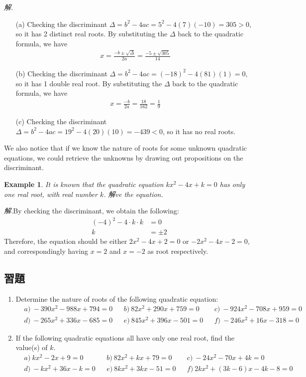 \documentclass[12pt]{article}
\newtheorem{example}{Example}
\begin{document}
    \textit{ 解.}\begin{enumerate}
        \item[(a)] Checking the discriminant $\Delta=b^2-4ac=5^2-4(7)(-10)=305>0$, so it has 2 distinct real roots. By substituting the $\Delta$ back to the quadratic formula, we have \begin{align*}
            x=\frac{-b\pm\sqrt{\Delta}}{2a}=\frac{-5\pm\sqrt{305}}{14}
        \end{align*}
        \item[(b)] Checking the discriminant $\Delta=b^2-4ac=(-18)^2-4(81)(1)=0$, so it has 1 double real root. By substituting the $\Delta$ back to the quadratic formula, we have \begin{align*}
            x=\frac{-b}{2a}=\frac{18}{162}=\frac{1}{9}
        \end{align*}
        \item[(c)] Checking the discriminant $\Delta=b^2-4ac=19^2-4(20)(10)=-439<0$, so it has no real roots. 
    \end{enumerate}

    We also notice that if we know the nature of roots for some unknown quadratic equations, we could retrieve the unknowns by drawing out propositions on the discriminant.

    \begin{example}
        It is known that the quadratic equation $kx^2-4x+k=0$ has only one real root, with real number $k$. 解ve the equation.
    \end{example}

    \textit{ 解.}By checking the discriminant, we obtain the following:\begin{align*}
        (-4)^2-4\cdot k\cdot k&=0\\
        k&=\pm 2
    \end{align*}
    \indent \indent Therefore, the equation should be either $2x^2-4x+2=0$ or $-2x^2-4x-2=0$, and correspondingly having $x=2$ and $x=-2$ as root respectively.

    \subsection*{習題}
    \begin{enumerate}
        \item Determine the nature of roots of the following quadratic equation:\begin{align*}
            &a)\ -390x^2-988x+794=0&&b)\ 82x^2+290x+759=0&&c)\ -924x^2-708x+959=0\\
            &d)\ -265x^2+336x-685=0&&e)\ 845x^2+396x-501=0&&f)\ -246x^2+16x-318=0
        \end{align*}
        \item If the following quadratic equations all have only one real root, find the value(s) of $k$.\begin{align*}
            &a)\ kx^2-2x+9=0&&b)\ 82x^2+kx+79=0&&c)\ -24x^2-70x+4k=0\\
            &d)\ -kx^2+36x-k=0&&e)\ 8kx^2+3kx-51=0&&f)\ 2kx^2+(3k-6)x-4k-8=0
        \end{align*}
    \end{enumerate}
\end{document}
